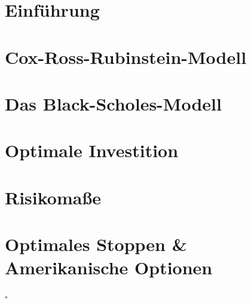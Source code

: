 \documentclass[ngerman, a4paper, 11pt]{report}
\theoremstyle{plain}
\theoremstyle{plain}
\theoremstyle{plain}
\theoremstyle{nonumberplain}
\theoremstyle{proofstyle}
\begin{document}
    
    \tableofcontents
    
    \vfill
    {\footnotesize \doclicenseThis }
    
    \chapter{Einführung}
    \label{chapter_1_einfuehrung}
    
    
    
    
    
    
    \chapter{Cox-Ross-Rubinstein-Modell}
    \label{chapter_2_crr}
    
    
    
    
    
    \chapter{Das Black-Scholes-Modell}
    \label{chapter_3_blackScholes}
    
    
    \chapter{Optimale Investition}
    \label{chapter_4_optimaleInvesition}
    
    
    
    
    
    
    \chapter{Risikomaße}
    \label{chapter_5_risikomasse}
    
    
    
    
    
    
    \chapter{Optimales Stoppen \& Amerikanische Optionen}
    \label{chapter_6_optimalesStoppen}
    
    
    
    
    \vfill \hfill $\square$
\end{document}
